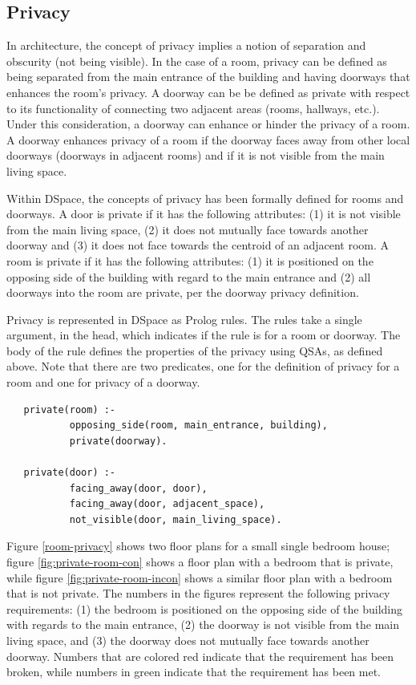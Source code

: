 \documentclass[12pt]{ucthesis}
\begin{document}
\subsection{Privacy}
In architecture, the concept of privacy implies a notion of separation and obscurity (not being visible). In the case of a room, privacy can be defined as being separated from the main entrance of the building and having doorways that enhances the room's privacy. A doorway can be be defined as private with respect to its functionality of connecting two adjacent areas (rooms, hallways, etc.). Under this consideration, a doorway can enhance or hinder the privacy of a room. A doorway enhances privacy of a room if the doorway faces away from other local doorways (doorways in adjacent rooms) and if it is not visible from the main living space. 

Within DSpace, the concepts of privacy has been formally defined for rooms and doorways. A door is private if it has the following attributes: (1) it is not visible from the main living space, (2) it does not mutually face towards another doorway and (3) it does not face towards the centroid of an adjacent room. A room is private if it has the following attributes: (1) it is positioned on the opposing side of the building with regard to the main entrance and (2) all doorways into the room are private, per the doorway privacy definition.
 
Privacy is represented in DSpace as Prolog rules. The rules take a single argument, in the head, which indicates if the rule is for a room or doorway. The body of the rule defines the properties of the privacy using QSAs, as defined above. Note that there are two predicates, one for the definition of privacy for a room and one for privacy of a doorway.  

\begin{verbatim}
   private(room) :-  
           opposing_side(room, main_entrance, building), 
           private(doorway).
                     
   private(door) :- 
           facing_away(door, door),
           facing_away(door, adjacent_space),
           not_visible(door, main_living_space). 
\end{verbatim}

Figure \ref{room-privacy} shows two floor plans for a small single bedroom house; figure \ref{fig:private-room-con} shows a floor plan with a bedroom that is  private, while figure \ref{fig:private-room-incon} shows a similar floor plan with a bedroom that is not private. The numbers in the figures represent the following privacy requirements: (1) the bedroom is positioned on the opposing side of the building with regards to the main entrance, (2) the doorway is not visible from the main living space, and (3) the doorway does not mutually face towards another doorway. Numbers that are colored red indicate that the requirement has been broken, while numbers in green indicate that the requirement has been met.
\end{document}
